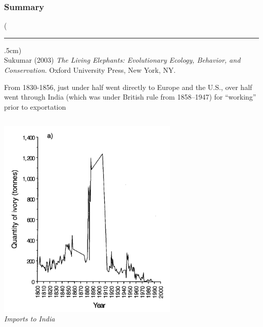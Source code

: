\documentclass[10pt]{beamer}
\newenvironment{reference}[2]{%
	\begin{textblock*}{\textwidth}(#1,#2)
		\tiny\bgroup\color{gray}}{\egroup\end{textblock*}}
\begin{document}
\begin{frame}[t]
\frametitle{Summary}
\vspace{0.5cm}

	\begin{reference}{4mm}{90mm}
		\rule{1.5cm}{0.25pt}\\
		Sukumar (2003) \emph{The Living Elephants: Evolutionary Ecology, Behavior, and Conservation}. Oxford University Press, New York, NY.
	\end{reference}
	
	From  1830-1856, just under half went directly to Europe and the U.S., over half went through India (which was under British rule from 1858--1947) for ``working'' prior to exportation\\
	
	\vspace{0.5cm}
	
	\begin{columns}
		\begin{column}{0.5\textwidth}
			\begin{center}
				\includegraphics[width=0.65\textwidth]{figures/india_plot.png}\\
				\emph{\footnotesize{Imports to India}}
			\end{center}	
		\end{column}
		

\end{columns}
\end{frame}
\end{document}
